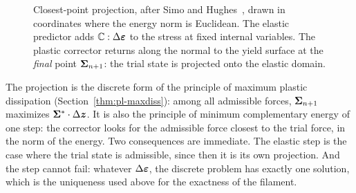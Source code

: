 \begin{figure}[h]
\centering
{}
\caption{Closest-point projection, after Simo and
Hughes~\cite[Fig.~3.2]{SimoHughesCI}, drawn in coordinates where the energy
norm is Euclidean. The elastic predictor adds $\mathbb{C}:\Delta\bm{\varepsilon}$ to the stress
at fixed internal variables. The plastic corrector returns along the normal to
the yield surface at the \emph{final} point $\bm{\Sigma}_{n+1}$: the trial state is
projected onto the elastic domain.}
\label{fig:pn-cpp}
\end{figure}

The projection is the discrete form of the principle of maximum plastic
dissipation (Section~\ref{thm:pl-maxdiss}): among all admissible forces,
$\bm{\Sigma}_{n+1}$ maximizes $\bm{\Sigma}^\ast\cdot\Delta\bm{z}$. It is also the principle of
minimum complementary energy of one step: the corrector looks for the
admissible force closest to the trial force, in the norm of the energy. Two
consequences are immediate. The elastic step is the case where the trial
state is admissible, since then it is its own projection. And the step
cannot fail: whatever $\Delta\bm{\varepsilon}$, the discrete problem has exactly one
solution, which is the uniqueness used above for the exactness of the
filament.

